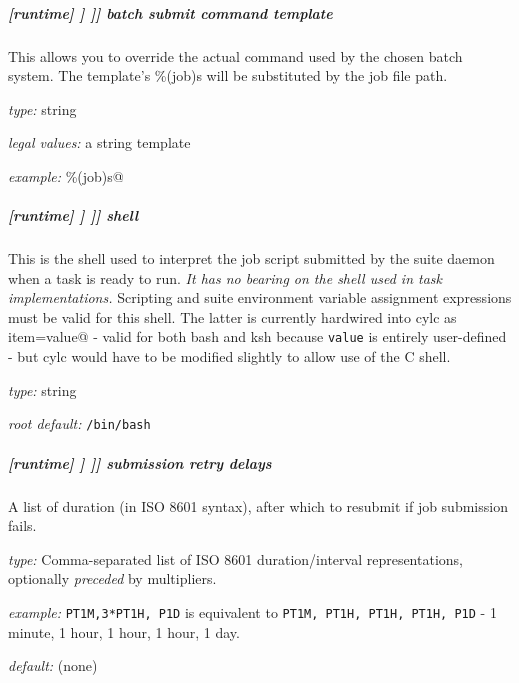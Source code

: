\subparagraph[batch submit command template]{[runtime] \textrightarrow [[\_\_NAME\_\_]] \textrightarrow [[[job]]] \textrightarrow batch submit command template}

This allows you to override the actual command used by the chosen batch
system. The template's \%(job)s will be substituted by the
job file path.

\begin{myitemize}
\item {\em type:} string
\item {\em legal values:} a string template
\item {\em example:} \lstinline@llsubmit \%(job)s@
\end{myitemize}

\subparagraph[shell]{[runtime] \textrightarrow [[\_\_NAME\_\_]] \textrightarrow [[[job]]] \textrightarrow shell}
\label{JobSubShell}

This is the shell used to interpret the job script submitted by the suite
daemon when a task is ready to run.  {\em It has no bearing on the shell used
in task implementations.} Scripting and suite environment
variable assignment expressions must be valid for this shell. The
latter is currently hardwired into cylc as
\lstinline@export item=value@ - valid for both bash and ksh
because \lstinline=value= is entirely user-defined - but cylc would have
to be modified slightly to allow use of the C shell.

\begin{myitemize}
\item {\em type:} string
\item {\em root default:} \lstinline=/bin/bash=
\end{myitemize}

\subparagraph[submission retry delays]{[runtime] \textrightarrow [[\_\_NAME\_\_]] \textrightarrow [[[job]]] \textrightarrow submission retry delays}
\label{JobSubRefRetries}

A list of duration (in ISO 8601 syntax), after which to resubmit if job
submission fails.
\begin{myitemize}
    \item {\em type:} Comma-separated list of ISO 8601 duration/interval
        representations, optionally {\em preceded} by multipliers.
    \item {\em example:} \lstinline=PT1M,3*PT1H, P1D= is equivalent to
    \lstinline=PT1M, PT1H, PT1H, PT1H, P1D= - 1 minute, 1 hour, 1 hour, 1
    hour, 1 day.
    \item {\em default:} (none)
\end{myitemize}

